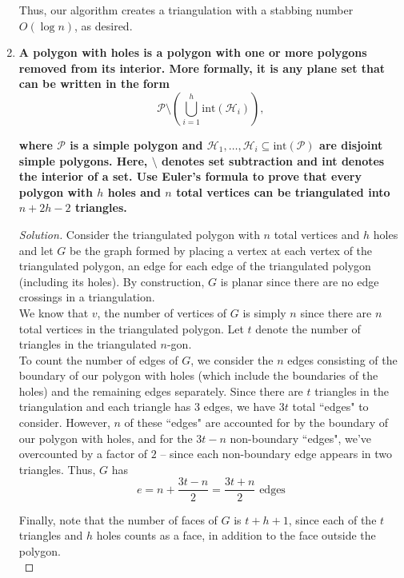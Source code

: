 \documentclass[11pt]{article}
\newenvironment{solution}
  {\renewcommand\qedsymbol{$\blacksquare$}\begin{proof}[Solution]}
  {\end{proof}}
\begin{document}
\begin{enumerate}
    Thus, our algorithm creates a triangulation with a stabbing number $O(\log n)$, as desired.

    
    \newpage

\item \textbf{A polygon with holes is a polygon with one or more polygons removed from its interior. More formally, it is any plane set that can be written in the form}
\[ \mathcal{P} \setminus \left( \bigcup_{i=1}^h \mathrm{int}(\mathcal{H}_i)\right),\]

\textbf{where $\mathcal{P}$ is a simple polygon and $\mathcal{H}_1, \dots, \mathcal{H}_i \subseteq \mathrm{int}(\mathcal{P})$ are disjoint simple polygons. Here, $\setminus$ denotes set subtraction and int denotes the interior of a set. Use Euler's formula to prove that every polygon with $h$ holes and $n$ total vertices can be triangulated into $n + 2h-2$ triangles.}

\begin{solution}
Consider the triangulated polygon with $n$ total vertices and $h$ holes and let $G$ be the graph formed by placing a vertex at each vertex of the triangulated polygon, an edge for each edge of the triangulated polygon (including its holes). By construction, $G$ is planar since there are no edge crossings in a triangulation. \\

We know that $v$, the number of vertices of $G$ is simply $n$ since there are $n$ total vertices in the triangulated polygon. Let $t$ denote the number of triangles in the triangulated $n$-gon. \\

To count the number of edges of $G$, we consider the $n$ edges consisting of the boundary of our polygon with holes (which include the boundaries of the holes) and the remaining edges separately. Since there are $t$ triangles in the triangulation and each triangle has $3$ edges, we have $3t$ total ``edges" to consider. However, $n$ of these ``edges" are accounted for by the boundary of our polygon with holes, and for the $3t - n$ non-boundary ``edges", we've overcounted by a factor of $2$ -- since each non-boundary edge appears in two triangles. Thus, $G$ has \[ e= n + \frac{3t-n}{2} = \frac{3t + n}{2} \text{ edges}\]

Finally, note that the number of faces of $G$ is $t + h + 1$, since each of the $t$ triangles and $h$ holes counts as a face, in addition to the face outside the polygon. \\


\end{solution}
\end{enumerate}
\end{document}
